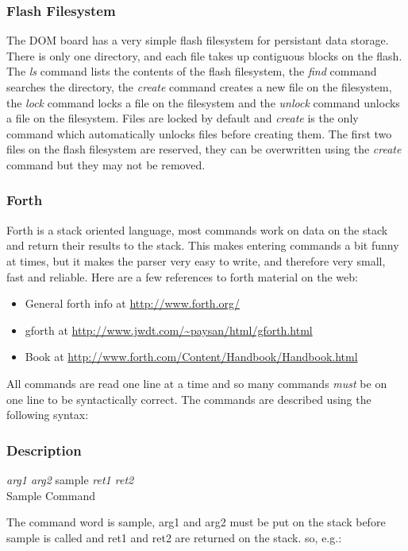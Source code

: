 \documentclass{article}
\newcommand{\samplecmd}[4]{
        \subsubsection*{Description}
        \emph{#2} #1 \emph{#3} \medskip \\
        #4
}
\begin{document}
\subsubsection{Flash Filesystem}

The DOM board has a very simple flash
filesystem for persistant data storage.
There is only one directory, and each
file takes up contiguous blocks on the
flash.  The \emph{ls} command lists the contents
of the flash filesystem, the \emph{find} command
searches the directory, the \emph{create} command
creates a new file on the filesystem, the \emph{lock}
command locks a file on the filesystem and the
\emph{unlock} command unlocks a file on the filesystem.
Files are locked by default and \emph{create} is
the only command which automatically unlocks files
before creating them.  The first two files on
the flash filesystem are reserved, they can be
overwritten using the \emph{create} command but they
may not be removed.

\subsubsection{Forth}

Forth is a stack oriented language, most commands
work on data on the stack and return their results
to the stack.  This makes entering commands a bit
funny at times, but it makes the parser very easy
to write, and therefore very small, fast and reliable.
Here are a
few references to forth material on the web:

\begin{itemize}

\item General forth info at \url{http://www.forth.org/}
\item gforth at \url{http://www.jwdt.com/~paysan/html/gforth.html}
\item Book at \url{http://www.forth.com/Content/Handbook/Handbook.html}

\end{itemize}

All commands are read one line at a time
and so many commands \emph{must} be on one line to be
syntactically correct.
The commands are described using the following
syntax:

\samplecmd{sample}{arg1 arg2}{ret1 ret2}{Sample Command}

The command word is sample, arg1 and arg2 must be
put on the stack before sample is called and ret1 and
ret2 are returned on the stack.  so, e.g.:
\end{document}
